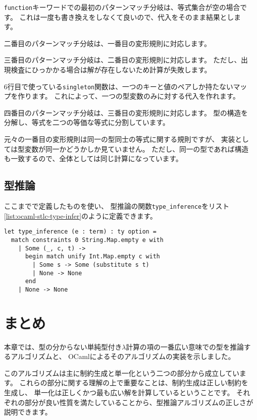 \texttt{function}キーワードでの最初のパターンマッチ分岐は、等式集合が空の場合です。
これは一度も書き換えをしなくて良いので、代入をそのまま結果とします。

二番目のパターンマッチ分岐は、一番目の変形規則に対応します。

三番目のパターンマッチ分岐は、二番目の変形規則に対応します。
ただし、出現検査にひっかかる場合は解が存在しないため計算が失敗します。

6行目で使っている\texttt{singleton}関数は、一つのキーと値のペアしか持たないマップを作ります。
これによって、一つの型変数のみに対する代入を作れます。

四番目のパターンマッチ分岐は、三番目の変形規則に対応します。
型の構造を分解し、等式を二つの等価な等式に分割しています。

元々の一番目の変形規則は同一の型同士の等式に関する規則ですが、
実装としては型変数が同一かどうかしか見ていません。
ただし、同一の型であれば構造も一致するので、全体としては同じ計算になっています。

\subsection{型推論}

ここまでで定義したものを使い、
型推論の関数\texttt{type\_inference}をリスト\ref{list:ocaml-stlc-type-infer}のように定義できます。

\begin{lstlisting}[caption=型推論, label=list:ocaml-stlc-type-infer]
let type_inference (e : term) : ty option =
  match constraints 0 String.Map.empty e with
    | Some (_, c, t) ->
      begin match unify Int.Map.empty c with
        | Some s -> Some (substitute s t)
        | None -> None
      end
    | None -> None
\end{lstlisting}

\section{まとめ}

本章では、型の分からない単純型付き$\lambda$計算の項の一番広い意味での型を推論するアルゴリズムと、
OCamlによるそのアルゴリズムの実装を示しました。

このアルゴリズムは主に制約生成と単一化という二つの部分から成立しています。
これらの部分に関する理解の上で重要なことは、制約生成は正しい制約を生成し、
単一化は正しくかつ最も広い解を計算しているということです。
それぞれの部分が良い性質を満たしていることから、型推論アルゴリズムの正しさが説明できます。

